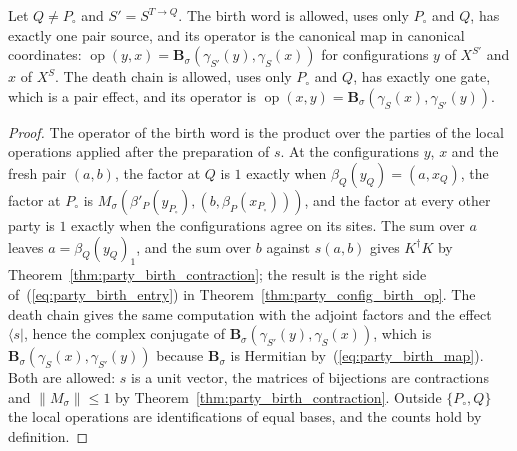 \begin{theorem}
    \label{thm:party_birth_word}
    \leanok
    Let $Q\neq P_\circ$ and $S'=S^{T\to Q}$. The birth word is allowed, uses only $P_\circ$
    and $Q$, has exactly one pair source, and its operator is the canonical map in canonical
    coordinates: $\operatorname{op}(y,x)=\mathbf B_\sigma(\gamma_{S'}(y),\gamma_S(x))$ for
    configurations $y$ of $X^{S'}$ and $x$ of $X^S$. The death chain is allowed, uses only
    $P_\circ$ and $Q$, has exactly one gate, which is a pair effect, and its operator is
    $\operatorname{op}(x,y)=\mathbf B_\sigma(\gamma_S(x),\gamma_{S'}(y))$.
\end{theorem}
\begin{proof}\leanok
    The operator of the birth word is the product over the parties of the local operations
    applied after the preparation of $s$. At the configurations $y$, $x$ and the fresh pair
    $(a,b)$, the factor at $Q$ is $1$ exactly when $\beta_Q(y_Q)=(a,x_Q)$, the factor at $P_\circ$
    is $M_\sigma(\beta'_P(y_{P_\circ}),(b,\beta_P(x_{P_\circ})))$, and the factor at every other
    party is $1$ exactly when the configurations agree on its sites. The sum over $a$ leaves
    $a=\beta_Q(y_Q)_1$, and the sum over $b$ against $s(a,b)$ gives $K^\dagger K$ by
    Theorem~\ref{thm:party_birth_contraction}; the result is the right side
    of~(\ref{eq:party_birth_entry}) in Theorem~\ref{thm:party_config_birth_op}. The death chain
    gives the same computation with the adjoint factors and the effect $\langle s|$, hence the
    complex conjugate of $\mathbf B_\sigma(\gamma_{S'}(y),\gamma_S(x))$, which is
    $\mathbf B_\sigma(\gamma_S(x),\gamma_{S'}(y))$ because $\mathbf B_\sigma$ is Hermitian
    by~(\ref{eq:party_birth_map}). Both are allowed: $s$ is a unit vector, the matrices of
    bijections are contractions and $\lVert M_\sigma\rVert\leq1$ by
    Theorem~\ref{thm:party_birth_contraction}. Outside $\{P_\circ,Q\}$ the local operations are
    identifications of equal bases, and the counts hold by definition.
\end{proof}

